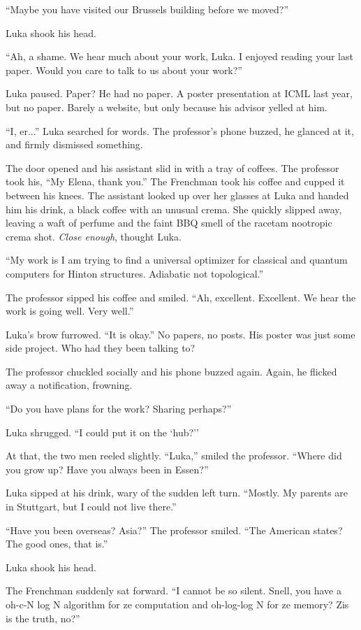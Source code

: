 \documentclass[ebook,11pt,oneside,openany]{memoir}
\newcommand{\thought}[1]{\textit{#1}}
\begin{document}
``Maybe you have visited our Brussels building before we moved?''

Luka shook his head.

``Ah, a shame. We hear much about your work, Luka. I enjoyed reading your last paper. Would you care to talk to us about your work?''

Luka paused. Paper? He had no paper. A poster presentation at ICML last year, but no paper. Barely a website, but only because his advisor yelled at him.

``I, er...'' Luka searched for words. The professor's phone buzzed, he glanced at it, and firmly dismissed something.

The door opened and his assistant slid in with a tray of coffees. The professor took his, ``My Elena, thank you.'' The Frenchman took his coffee and cupped it between his knees. The assistant looked up over her glasses at Luka and handed him his drink, a black coffee with an unusual crema. She quickly slipped away, leaving a waft of perfume and the faint BBQ smell of the racetam nootropic crema shot. \thought{Close enough}, thought Luka.

``My work is I am trying to find a universal optimizer for classical and quantum computers for Hinton structures. Adiabatic not topological.''

The professor sipped his coffee and smiled. ``Ah, excellent. Excellent. We hear the work is going well. Very well.''

Luka's brow furrowed. ``It is okay.'' No papers, no posts. His poster was just some side project. Who had they been talking to?

The professor chuckled socially and his phone buzzed again. Again, he flicked away a notification, frowning.

``Do you have plans for the work? Sharing perhaps?''

Luka shrugged. ``I could put it on the `hub?''

At that, the two men reeled slightly. ``Luka,'' smiled the professor. ``Where did you grow up? Have you always been in Essen?''

Luka sipped at his drink, wary of the sudden left turn. ``Mostly. My parents are in Stuttgart, but I could not live there.''

``Have you been overseas? Asia?'' The professor smiled. ``The American states? The good ones, that is.''

Luka shook his head.

The Frenchman suddenly sat forward. ``I cannot be so silent. Snell, you have a oh-c-N log N algorithm for ze computation and oh-log-log N for ze memory? Zis is the truth, no?''
\end{document}
